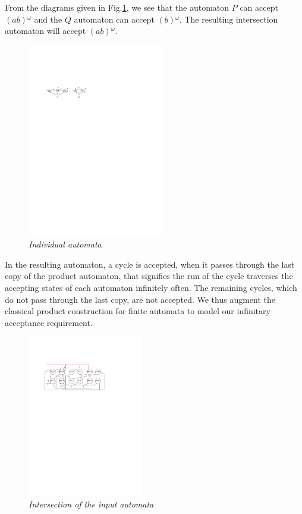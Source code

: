 \noindent
From the diagrams given in Fig.\ref{fig1}, we see that the automaton $P$ can accept $(ab){^\omega}$ 
and the $Q$ automaton can accept $(b){^\omega}$. The resulting intersection automaton will accept
$(ab){^\omega}$. \\

\begin{figure}
\begin{center}
\includegraphics[width=60mm]{example_1.pdf}

\caption{{\em Individual automata}} \label{fig1}
\end{center}
\end{figure}
 

\noindent
 In the resulting automaton, a cycle is accepted, when it passes through the last copy
 of the product automaton, that signifies the run of the cycle traverses the accepting states of each automaton infinitely often. The remaining cycles, 
 which do not pass through the last copy, are not accepted. We thus augment the classical product construction for finite automata to model our infinitary acceptance requirement.

 
 \begin{figure}
\begin{center}
\includegraphics[width=50mm]{state_copy_transition_cycle.pdf}
\end{center}
\caption{{\em Intersection of the input automata}}
\label{transition}
\end{figure}

